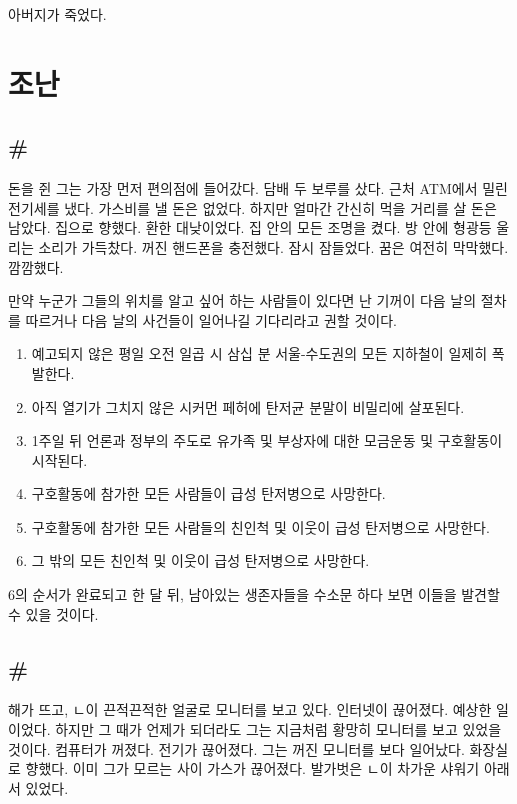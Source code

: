 \documentclass[a5paper,10pt, twoside, openright]{memoir}
\begin{document}
	아버지가 죽었다.



			\chapter{조난} 

				\section{\#} 
	돈을 쥔 그는 가장 먼저 편의점에 들어갔다. 담배 두 보루를 샀다. 근처 ATM에서 밀린 전기세를 냈다. 가스비를 낼 돈은 없었다. 하지만 얼마간 간신히 먹을 거리를 살 돈은 남았다. 집으로 향했다. 환한 대낮이었다. 집 안의 모든 조명을 켰다. 방 안에 형광등 울리는 소리가 가득찼다. 꺼진 핸드폰을 충전했다. 잠시 잠들었다. 꿈은 여전히 막막했다. 깜깜했다.

	만약 누군가 그들의 위치를 알고 싶어 하는 사람들이 있다면 난 기꺼이 다음 날의 절차를 따르거나 다음 날의 사건들이 일어나길 기다리라고 권할 것이다.
	
				\begin{adjustwidth}{1em}{3em}	
	\begin{enumerate}
	\item 예고되지 않은 평일 오전 일곱 시 삼십 분 서울-수도권의 모든 지하철이 일제히 폭발한다. 
	\item 아직 열기가 그치지 않은 시커먼 페허에 탄저균 분말이 비밀리에 살포된다. 
	\item 1주일 뒤 언론과 정부의 주도로 유가족 및 부상자에 대한 모금운동 및 구호활동이 시작된다. 
	\item 구호활동에 참가한 모든 사람들이 급성 탄저병으로 사망한다. 
	\item 구호활동에 참가한 모든 사람들의 친인척 및 이웃이 급성 탄저병으로 사망한다. 
	\item 그 밖의 모든 친인척 및 이웃이 급성 탄저병으로 사망한다. 
	\end{enumerate}
				\end{adjustwidth}

	6의 순서가 완료되고 한 달 뒤, 남아있는 생존자들을 수소문 하다 보면 이들을 발견할 수 있을 것이다.

	\section{\#}
	해가 뜨고, ㄴ이 끈적끈적한 얼굴로 모니터를 보고 있다. 인터넷이 끊어졌다. 예상한 일이었다. 하지만 그 때가 언제가 되더라도 그는 지금처럼 황망히 모니터를 보고 있었을 것이다. 컴퓨터가 꺼졌다. 전기가 끊어졌다. 그는 꺼진 모니터를 보다 일어났다. 화장실로 향했다. 이미 그가 모르는 사이 가스가 끊어졌다. 발가벗은 ㄴ이 차가운 샤워기 아래 서 있었다.
\end{document}

